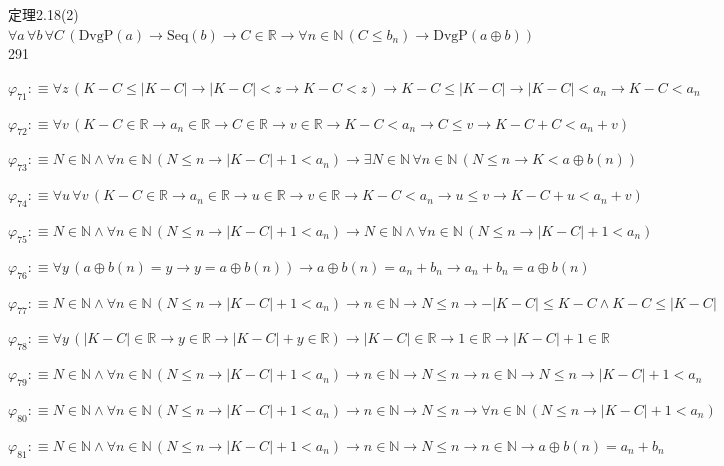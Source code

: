 \begin{fullproof}{定理2.18(2)}{$\forall a\,\forall b\,\forall C\,(\mathrm{DvgP}(a) \to \mathrm{Seq}(b) \to C \in \mathbb{R} \to \forall n \in \mathbb{N}\,(C \leq b_{n}) \to \mathrm{DvgP}(a \oplus b))$}{291}
\begin{abbrevlist}
\item $\varphi_{71} :\equiv \forall z\,(K - C \leq \lvert K - C \rvert \to \lvert K - C \rvert < z \to K - C < z) \to K - C \leq \lvert K - C \rvert \to \lvert K - C \rvert < a_{n} \to K - C < a_{n}$
\item $\varphi_{72} :\equiv \forall v\,(K - C \in \mathbb{R} \to a_{n} \in \mathbb{R} \to C \in \mathbb{R} \to v \in \mathbb{R} \to K - C < a_{n} \to C \leq v \to K - C + C < a_{n} + v)$
\item $\varphi_{73} :\equiv N \in \mathbb{N} \land \forall n \in \mathbb{N}\,(N \leq n \to \lvert K - C \rvert + 1 < a_{n}) \to \exists N \in \mathbb{N}\,\forall n \in \mathbb{N}\,(N \leq n \to K < a \oplus b(n))$
\item $\varphi_{74} :\equiv \forall u\,\forall v\,(K - C \in \mathbb{R} \to a_{n} \in \mathbb{R} \to u \in \mathbb{R} \to v \in \mathbb{R} \to K - C < a_{n} \to u \leq v \to K - C + u < a_{n} + v)$
\item $\varphi_{75} :\equiv N \in \mathbb{N} \land \forall n \in \mathbb{N}\,(N \leq n \to \lvert K - C \rvert + 1 < a_{n}) \to N \in \mathbb{N} \land \forall n \in \mathbb{N}\,(N \leq n \to \lvert K - C \rvert + 1 < a_{n})$
\item $\varphi_{76} :\equiv \forall y\,(a \oplus b(n) = y \to y = a \oplus b(n)) \to a \oplus b(n) = a_{n} + b_{n} \to a_{n} + b_{n} = a \oplus b(n)$
\item $\varphi_{77} :\equiv N \in \mathbb{N} \land \forall n \in \mathbb{N}\,(N \leq n \to \lvert K - C \rvert + 1 < a_{n}) \to n \in \mathbb{N} \to N \leq n \to -\lvert K - C \rvert \leq K - C \land K - C \leq \lvert K - C \rvert$
\item $\varphi_{78} :\equiv \forall y\,(\lvert K - C \rvert \in \mathbb{R} \to y \in \mathbb{R} \to \lvert K - C \rvert + y \in \mathbb{R}) \to \lvert K - C \rvert \in \mathbb{R} \to 1 \in \mathbb{R} \to \lvert K - C \rvert + 1 \in \mathbb{R}$
\item $\varphi_{79} :\equiv N \in \mathbb{N} \land \forall n \in \mathbb{N}\,(N \leq n \to \lvert K - C \rvert + 1 < a_{n}) \to n \in \mathbb{N} \to N \leq n \to n \in \mathbb{N} \to N \leq n \to \lvert K - C \rvert + 1 < a_{n}$
\item $\varphi_{80} :\equiv N \in \mathbb{N} \land \forall n \in \mathbb{N}\,(N \leq n \to \lvert K - C \rvert + 1 < a_{n}) \to n \in \mathbb{N} \to N \leq n \to \forall n \in \mathbb{N}\,(N \leq n \to \lvert K - C \rvert + 1 < a_{n})$
\item $\varphi_{81} :\equiv N \in \mathbb{N} \land \forall n \in \mathbb{N}\,(N \leq n \to \lvert K - C \rvert + 1 < a_{n}) \to n \in \mathbb{N} \to N \leq n \to n \in \mathbb{N} \to a \oplus b(n) = a_{n} + b_{n}$

\end{abbrevlist}
\end{fullproof}

